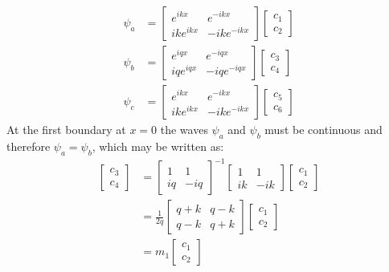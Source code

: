 \documentclass[12pt,a4paper]{article}
\begin{document}
		\begin{align}
			\psi_{a}&=
			\left[\begin{array}{ccc}
				e^{ikx}&e^{-ikx}\\
				ike^{ikx}&-ike^{-ikx}
			\end{array}\right]
			\left[\begin{array}{ccc}
				c_{1}\\
				c_{2}
			\end{array}\right]
			\\
			\psi_{b}&=
			\left[\begin{array}{ccc}
				e^{iqx}&e^{-iqx}\\
				iqe^{iqx}&-iqe^{-iqx}
			\end{array}\right]
			\left[\begin{array}{ccc}
				c_{3}\\
				c_{4}
			\end{array}\right]
			\\
			\psi_{c}&=
			\left[\begin{array}{ccc}
				e^{ikx}&e^{-ikx}\\
				ike^{ikx}&-ike^{-ikx}
			\end{array}\right]
			\left[\begin{array}{ccc}
				c_{5}\\
				c_{6}
			\end{array}\right]
		\end{align}
		At the first boundary at $x=0$ the waves $\psi_{a}$ and $\psi_{b}$ must be continuous and therefore $\psi_{a}=\psi_{b}$, which may be written as:
		\begin{align}
			\left[\begin{array}{ccc}
				c_{3}\\
				c_{4}
			\end{array}\right]
			&=
			\left[\begin{array}{ccc}
				1&1\\
				iq&-iq
			\end{array}\right]^{-1}
			\left[\begin{array}{ccc}
				1&1\\
				ik&-ik
			\end{array}\right]
			\left[\begin{array}{ccc}
				c_{1}\\
				c_{2}
			\end{array}\right]
			\\&=
			\frac{1}{2q}\left[\begin{array}{ccc}
				q+k&q-k\\
				q-k&q+k
			\end{array}\right]
			\left[\begin{array}{ccc}
				c_{1}\\
				c_{2}
			\end{array}\right]
			\\&=
			m_{1}\left[\begin{array}{ccc}
				c_{1}\\
				c_{2}
			\end{array}\right]
		\end{align}
\end{document}
